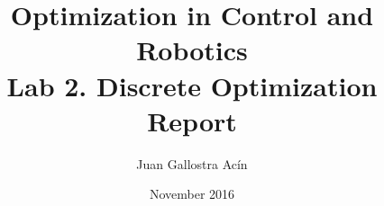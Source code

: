 \documentclass[a4paper]{Informe_style}
\begin{document}
\title{Optimization in Control and Robotics\\
Lab 2. Discrete Optimization\\
Report}
\author{Juan Gallostra Acín}
\date{November 2016}

\maketitle

\setcounter{page}{1}


%
%




\end{document}
